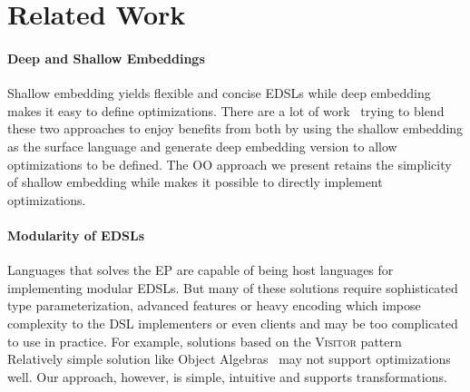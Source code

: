 \section{Related Work}

\paragraph{Deep and Shallow Embeddings}
Shallow embedding yields flexible and concise EDSLs while deep embedding makes
it easy to define optimizations.
There are a lot of work~\cite{svenningsson2012combining,
  Jovanovic:2014:YCD:2658761.2658771, scherr2014implicit} trying to blend these two
approaches to enjoy benefits from both by using the shallow embedding as the
surface language and generate deep embedding version to allow optimizations to
be defined.
The OO approach we present retains the simplicity of shallow embedding while
makes it possible to directly implement optimizations.

\paragraph{Modularity of EDSLs}
Languages that solves the EP are capable of being host languages for
implementing modular EDSLs. But many of these solutions require sophisticated
type parameterization, advanced features or heavy encoding which impose
complexity to the DSL implementers or even clients and may be too complicated to use in practice.
For example, solutions based on the \textsc{Visitor}
pattern~\cite{oliveira09modular,hofer2010modular} %
Relatively simple solution like Object Algebras~\cite{bruno12oa} may not support
optimizations well.
Our approach, however, is simple, intuitive and supports transformations.
